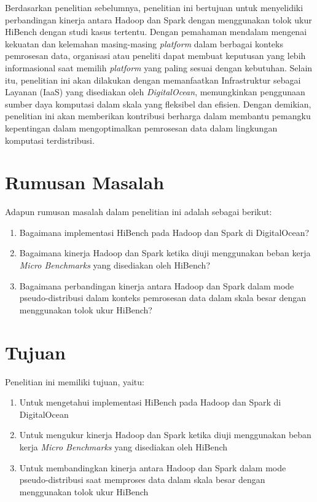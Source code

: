 Berdasarkan penelitian sebelumnya, penelitian ini bertujuan untuk menyelidiki perbandingan kinerja antara Hadoop dan Spark dengan menggunakan tolok ukur HiBench dengan studi kasus tertentu. Dengan pemahaman mendalam mengenai kekuatan dan kelemahan masing-masing \textit{platform} dalam berbagai konteks pemrosesan data, organisasi atau peneliti dapat membuat keputusan yang lebih informasional saat memilih \textit{platform} yang paling sesuai dengan kebutuhan. Selain itu, penelitian ini akan dilakukan dengan memanfaatkan Infrastruktur sebagai Layanan (IaaS) yang disediakan oleh \textit{DigitalOcean}, memungkinkan penggunaan sumber daya komputasi dalam skala yang fleksibel dan efisien. Dengan demikian, penelitian ini akan memberikan kontribusi berharga dalam membantu pemangku kepentingan dalam mengoptimalkan pemrosesan data dalam lingkungan komputasi terdistribusi.

\section{Rumusan Masalah}
Adapun rumusan masalah dalam penelitian ini adalah sebagai berikut:
\begin{enumerate}
	\item Bagaimana implementasi HiBench pada Hadoop dan Spark di DigitalOcean?
	\item Bagaimana kinerja Hadoop dan Spark ketika diuji menggunakan  beban kerja \textit{Micro Benchmarks} yang disediakan oleh HiBench?
	\item Bagaimana perbandingan kinerja antara Hadoop dan Spark dalam mode pseudo-distribusi dalam konteks pemrosesan data dalam skala besar dengan menggunakan tolok ukur HiBench?
\end{enumerate}

\section{Tujuan}
Penelitian ini memiliki tujuan, yaitu:
	\begin{enumerate}
		\item Untuk mengetahui implementasi HiBench pada Hadoop dan Spark di DigitalOcean
		\item Untuk mengukur kinerja Hadoop dan Spark ketika diuji menggunakan  beban kerja \textit{Micro Benchmarks} yang disediakan oleh HiBench
		\item Untuk membandingkan kinerja antara Hadoop dan Spark dalam mode pseudo-distribusi saat memproses data dalam skala besar dengan menggunakan tolok ukur HiBench
	\end{enumerate}

